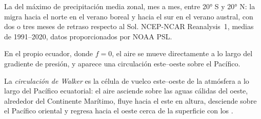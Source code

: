 \begin{omfigure}

{\small La  del máximo de precipitación media zonal, mes a mes, entre \ang{20} S y \ang{20} N: la  migra hacia el norte en el verano boreal y hacia el sur en el verano austral, con dos o tres meses de retraso respecto al Sol. NCEP-NCAR Reanalysis~1, medias de 1991--2020, datos proporcionados por NOAA PSL.}
\label{fig:b1:atmospheric-circulation:itcz}
\end{omfigure}

En el propio ecuador, donde $f = 0$, el aire se mueve directamente a lo largo del gradiente de presión, y aparece una circulación este--oeste sobre el Pacífico.

\begin{definition}\label{def:b1:atmospheric-circulation:walker}
La \emph{circulación de Walker} es la célula de vuelco este--oeste de la atmósfera a lo largo del Pacífico ecuatorial: el aire asciende sobre las aguas cálidas del oeste, alrededor del Continente Marítimo, fluye hacia el este en altura, desciende sobre el Pacífico oriental y regresa hacia el oeste cerca de la superficie con los .
\end{definition}

